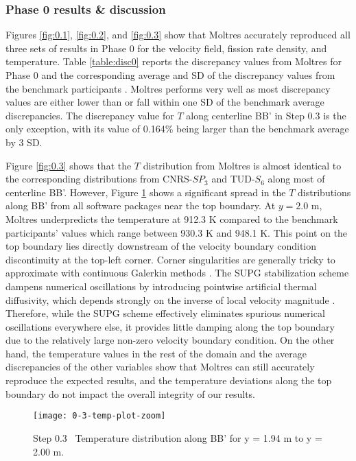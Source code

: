 \subsubsection{Phase 0 results \& discussion}

Figures \ref{fig:0.1}, \ref{fig:0.2}, and \ref{fig:0.3} show that Moltres
accurately reproduced all three sets of results in Phase 0 for the velocity
field, fission rate density, and temperature. Table
\ref{table:disc0} reports the discrepancy values from Moltres for Phase 0 and
the corresponding average and \gls{SD} of the discrepancy values from
the benchmark participants
\cite{tiberga_results_2020}. Moltres performs very well as most discrepancy
values are either lower than or fall within one \gls{SD} of the benchmark
average discrepancies. The discrepancy value for $T$ along centerline BB' in
Step 0.3 is the only exception, with its value of 0.164\% being larger than
the benchmark average by 3 \gls{SD}.

Figure \ref{fig:0.3} shows that the $T$ distribution from Moltres is almost
identical to the corresponding distributions from CNRS-$SP_3$ and TUD-$S_6$
along most of centerline BB'. However, Figure \ref{fig:0.3-zoom} shows a
significant spread in the $T$ distributions along BB' from all software
packages near the top boundary. At $y = 2.0$ m, Moltres underpredicts the
temperature at 912.3 K compared to the benchmark participants' values which
range between 930.3 K and 948.1 K. This point on the top boundary lies directly downstream of
the velocity boundary condition discontinuity at the top-left corner.
Corner singularities are generally tricky to approximate with
continuous Galerkin methods \cite{kuhlmann_lid-driven_2018}.
The \gls{SUPG} stabilization scheme dampens numerical oscillations by
introducing pointwise artificial thermal diffusivity, which depends strongly on
the inverse of local velocity magnitude \cite{peterson_overview_2018}.
Therefore, while the \gls{SUPG} scheme effectively eliminates
spurious numerical oscillations everywhere else, it provides little damping
along the top boundary due to the relatively large non-zero velocity boundary
condition. On the other hand, the temperature values in the rest of the domain
and the average discrepancies of the other variables show that Moltres can
still accurately reproduce the expected results, and the temperature deviations
along the top boundary do not impact the overall integrity of our results.

\begin{figure}[htb]
	\centering
	\texttt{[image: 0-3-temp-plot-zoom]}
	\caption{Step 0.3 \textemdash\ Temperature distribution along BB' for y = 1.94 m to
	y = 2.00 m.}
	\label{fig:0.3-zoom}
\end{figure}

